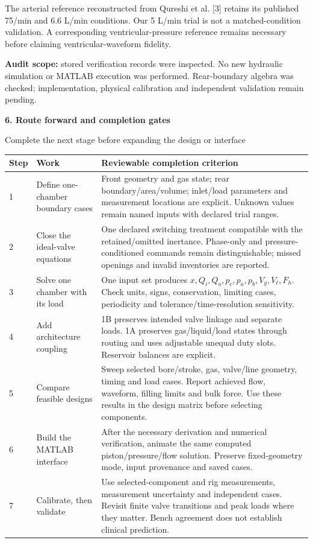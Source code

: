 \documentclass[11pt,a4paper]{article}
\newcommand{\pageheading}[2]{\markboth{#1}{} {\Large\sffamily\bfseries\color{ink}#1}\par {\small\color{teal}#2}\par\vspace{2mm}}
\begin{document}
The arterial reference reconstructed from Qureshi et al. [3] retains its published 75/min and 6.6 L/min conditions. Our 5 L/min trial is not a matched-condition validation. A corresponding ventricular-pressure reference remains necessary before claiming ventricular-waveform fidelity.

\textbf{Audit scope:} stored verification records were inspected. No new hydraulic simulation or MATLAB execution was performed. Rear-boundary algebra was checked; implementation, physical calibration and independent validation remain pending.

\newpage
\pageheading{6. Route forward and completion gates}{Complete the next stage before expanding the design or interface}

\par
{\small
\begin{tabularx}{\linewidth}{@{}P{.06\linewidth}P{.26\linewidth}Y@{}}
\toprule
Step & Work & Reviewable completion criterion \\
 & Define one-chamber boundary cases & Front geometry and gas state; rear boundary/area/volume; inlet/load parameters and measurement locations are explicit. Unknown values remain named inputs with declared trial ranges. \\
2 & Close the ideal-valve equations & One declared switching treatment compatible with the retained/omitted inertance. Phase-only and pressure-conditioned commands remain distinguishable; missed openings and invalid inventories are reported. \\
3 & Solve one chamber with its load & One input set produces $x,Q_i,Q_o,p_c,p_a,p_b,V_g,V_\ell,F_h$. Check units, signs, conservation, limiting cases, periodicity and tolerance/time-resolution sensitivity. \\
4 & Add architecture coupling & 1B preserves intended valve linkage and separate loads. 1A preserves gas/liquid/load states through routing and uses adjustable unequal duty slots. Reservoir balances are explicit. \\
5 & Compare feasible designs & Sweep selected bore/stroke, gas, valve/line geometry, timing and load cases. Report achieved flow, waveform, filling limits and bulk force. Use these results in the design matrix before selecting components. \\
6 & Build the MATLAB interface & After the necessary derivation and numerical verification, animate the same computed piston/pressure/flow solution. Preserve fixed-geometry mode, input provenance and saved cases. \\
7 & Calibrate, then validate & Use selected-component and rig measurements, measurement uncertainty and independent cases. Revisit finite valve transitions and peak loads where they matter. Bench agreement does not establish clinical prediction. \\
\bottomrule
\end{tabularx}}\par
\end{document}
